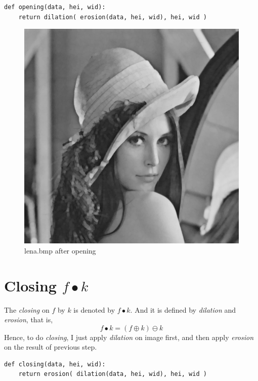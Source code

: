 \documentclass[14pt,a4paper]{extarticle}
\begin{document}
\begin{lstlisting}
def opening(data, hei, wid):
    return dilation( erosion(data, hei, wid), hei, wid )
\end{lstlisting}

\begin{figure}[H]
\centering
\includegraphics[scale=0.6]{lena-opening.bmp}
\caption{lena.bmp after opening}
\label{fig:lena-opening.bmp}
\end{figure}

\section{Closing $f \bullet k$}

The \textit{closing} on $f$ by $k$ is denoted by $f \bullet k$. And it is defined by \textit{dilation} and \textit{erosion}, that is,
\[ f \bullet k = (f \oplus k) \ominus k \]
Hence, to do \textit{closing}, I just apply \textit{dilation} on image first, and then apply \textit{erosion} on the result of previous step.

\begin{lstlisting}
def closing(data, hei, wid):
    return erosion( dilation(data, hei, wid), hei, wid )
\end{lstlisting}
\end{document}
